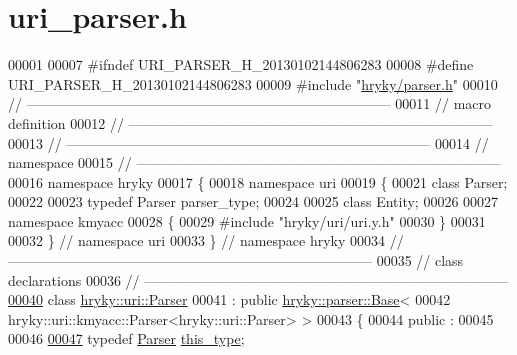 \hypertarget{uri__parser_8h_source}{\section{uri\-\_\-parser.\-h}
}

\begin{DoxyCode}
00001 
00007 \textcolor{preprocessor}{#ifndef URI\_PARSER\_H\_20130102144806283}
00008 \textcolor{preprocessor}{}\textcolor{preprocessor}{#define URI\_PARSER\_H\_20130102144806283}
00009 \textcolor{preprocessor}{}\textcolor{preprocessor}{#include "\hyperlink{parser_8h}{hryky/parser.h}"}
00010 \textcolor{comment}{//
      ------------------------------------------------------------------------------}
00011 \textcolor{comment}{// macro definition}
00012 \textcolor{comment}{//
      ------------------------------------------------------------------------------}
00013 \textcolor{comment}{//
      ------------------------------------------------------------------------------}
00014 \textcolor{comment}{// namespace}
00015 \textcolor{comment}{//
      ------------------------------------------------------------------------------}
00016 \textcolor{keyword}{namespace }hryky
00017 \{
00018 \textcolor{keyword}{namespace }uri
00019 \{
00021     \textcolor{keyword}{class }Parser;
00022 
00023     \textcolor{keyword}{typedef} Parser parser\_type;
00024 
00025     \textcolor{keyword}{class }Entity;
00026 
00027 \textcolor{keyword}{namespace }kmyacc
00028 \{
00029 \textcolor{preprocessor}{#include "hryky/uri/uri.y.h"}
00030 \}
00031 
00032 \} \textcolor{comment}{// namespace uri}
00033 \} \textcolor{comment}{// namespace hryky}
00034 \textcolor{comment}{//
      ------------------------------------------------------------------------------}
00035 \textcolor{comment}{// class declarations}
00036 \textcolor{comment}{//
      ------------------------------------------------------------------------------}
\hypertarget{uri__parser_8h_source_l00040}{}\hyperlink{classhryky_1_1uri_1_1_parser}{00040} \textcolor{comment}{}\textcolor{keyword}{class }\hyperlink{classhryky_1_1uri_1_1_parser}{hryky::uri::Parser}
00041     : \textcolor{keyword}{public} \hyperlink{classhryky_1_1parser_1_1_base}{hryky::parser::Base}<
00042         hryky::uri::kmyacc::Parser<hryky::uri::Parser> >
00043 \{
00044 \textcolor{keyword}{public} :
00045 
00046     
\hypertarget{uri__parser_8h_source_l00047}{}\hyperlink{classhryky_1_1uri_1_1_parser_ab16d652331f3a9386278bacd77c167ec}{00047}     \textcolor{keyword}{typedef} \hyperlink{classhryky_1_1uri_1_1_parser}{Parser} \hyperlink{classhryky_1_1uri_1_1_parser_ab16d652331f3a9386278bacd77c167ec}{this_type};

\end{DoxyCode}
